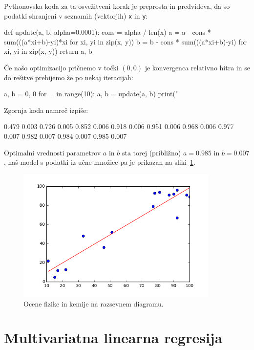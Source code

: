 Pythonovska koda za ta osvežitveni korak je preprosta in predvideva,
da so podatki shranjeni v seznamih (vektorjih) {\tt x} in {\tt y}:

\begin{python}
def update(a, b, alpha=0.0001):
    cons = alpha / len(x)
    a = a - cons * sum(((a*xi+b)-yi)*xi for xi, yi in zip(x, y))
    b = b - cons * sum(((a*xi+b)-yi) for xi, yi in zip(x, y))
    return a, b
\end{python}

Če našo optimizacijo pričnemo v točki $(0,0)$ je konvergenca relativno
hitra in se do rešitve prebijemo že po nekaj iteracijah:

\begin{python}
a, b = 0, 0
for _ in range(10):
    a, b = update(a, b)
    print("%
\end{python}

Zgornja koda namreč izpiše:
\begin{python}
0.479 0.003
0.726 0.005
0.852 0.006
0.918 0.006
0.951 0.006
0.968 0.006
0.977 0.007
0.982 0.007
0.984 0.007
0.985 0.007
\end{python}

Optimalni vrednosti parametrov $a$ in $b$ sta torej (približno)
$a=0.985$ in $b=0.007$, naš model s podatki iz učne množice
pa je prikazan na sliki~\ref{f:fiz-kem-opt-model}.

\begin{figure}[htbp]
\begin{center}
\includegraphics[width=10cm]{slike/fiz-kem-opt-model.png}
\caption{Ocene fizike in kemije na razsevnem diagramu.}
\label{f:fiz-kem-opt-model}
\end{center}
\end{figure}

\section{Multivariatna linearna regresija}

